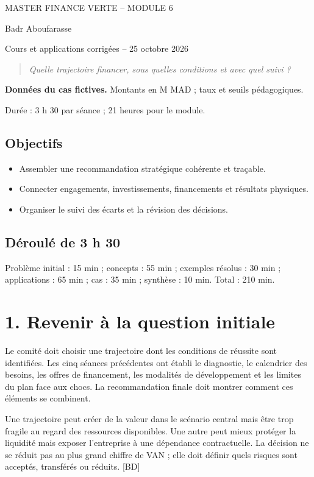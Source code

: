 \documentclass[12pt,a4paper]{article}
\begin{document}
\begin{center}{\small MASTER FINANCE VERTE -- MODULE 6}\par\vspace{8pt}{\Large\bfseries Séance 6 -- Décision intégrée et pilotage financier de la transition}\par\vspace{6pt}Badr Aboufarasse\par{\small Cours et applications corrigées -- 25 octobre 2026}\end{center}
\begin{quote}\itshape Quelle trajectoire financer, sous quelles conditions et avec quel suivi ?\end{quote}
\textbf{Données du cas fictives.} Montants en M MAD ; taux et seuils pédagogiques.\par Durée : 3 h 30 par séance ; 21 heures pour le module.

\subsection*{Objectifs}
\begin{itemize}\item Assembler une recommandation stratégique cohérente et traçable.\item Connecter engagements, investissements, financements et résultats physiques.\item Organiser le suivi des écarts et la révision des décisions.\end{itemize}
\subsection*{Déroulé de 3 h 30}
Problème initial : 15 min ; concepts : 55 min ; exemples résolus : 30 min ; applications : 65 min ; cas : 35 min ; synthèse : 10 min. Total : 210 min.

\section*{1. Revenir à la question initiale}
Le comité doit choisir une trajectoire dont les conditions de réussite sont identifiées. Les cinq séances précédentes ont établi le diagnostic, le calendrier des besoins, les offres de financement, les modalités de développement et les limites du plan face aux chocs. La recommandation finale doit montrer comment ces éléments se combinent.


Une trajectoire peut créer de la valeur dans le scénario central mais être trop fragile au regard des ressources disponibles. Une autre peut mieux protéger la liquidité mais exposer l’entreprise à une dépendance contractuelle. La décision ne se réduit pas au plus grand chiffre de VAN ; elle doit définir quels risques sont acceptés, transférés ou réduits. [BD]
\end{document}
